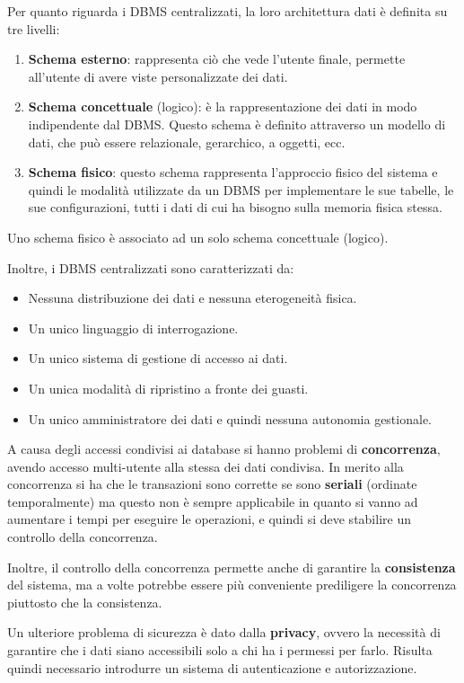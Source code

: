 Per quanto riguarda i DBMS centralizzati, la loro architettura dati è definita su tre livelli:
\begin{enumerate}
    \item \textbf{Schema esterno}: rappresenta ciò che vede l'utente finale,
          permette all'utente di avere viste personalizzate dei dati.
    \item \textbf{Schema concettuale} (logico): è la rappresentazione dei dati in modo
          indipendente dal DBMS. Questo schema è definito attraverso un modello
          di dati, che può essere relazionale, gerarchico, a oggetti, ecc.
    \item \textbf{Schema fisico}: questo schema rappresenta l'approccio fisico
          del sistema e quindi le modalità utilizzate da un DBMS per implementare
          le sue tabelle, le sue configurazioni, tutti i dati di cui ha bisogno
          sulla memoria fisica stessa.
\end{enumerate}
\begin{nota}
    Uno schema fisico è associato ad un solo schema concettuale (logico).
\end{nota}
Inoltre, i DBMS centralizzati sono caratterizzati da:
\begin{itemize}
    \item Nessuna distribuzione dei dati e nessuna eterogeneità fisica.
    \item Un unico linguaggio di interrogazione.
    \item Un unico sistema di gestione di accesso ai dati.
    \item Un unica modalità di ripristino a fronte dei guasti.
    \item Un unico amministratore dei dati e quindi nessuna autonomia gestionale.
\end{itemize}
A causa degli accessi condivisi ai database si hanno problemi di \textbf{concorrenza},
avendo accesso multi-utente alla stessa dei dati condivisa. In merito alla
concorrenza si ha che le transazioni sono corrette se sono \textbf{seriali}
(ordinate temporalmente) ma questo non è sempre applicabile in quanto si vanno
ad aumentare i tempi per eseguire le operazioni, e quindi si deve stabilire un
controllo della concorrenza.

Inoltre, il controllo della concorrenza permette anche di garantire la
\textbf{consistenza} del sistema, ma a volte potrebbe essere più conveniente
prediligere la concorrenza piuttosto che la consistenza.

Un ulteriore problema di sicurezza è dato dalla \textbf{privacy}, ovvero la
necessità di garantire che i dati siano accessibili solo a chi ha i permessi
per farlo. Risulta quindi necessario introdurre un sistema di autenticazione
e autorizzazione.

